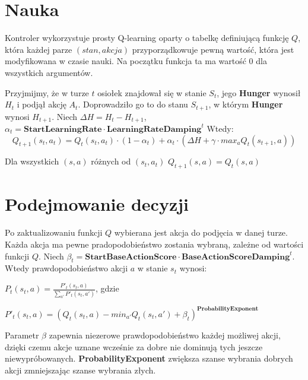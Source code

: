 \section{Nauka}
Kontroler wykorzystuje prosty Q-learning oparty o tabelkę definiującą funkcję $Q$, która każdej parze $(stan,akcja)$ przyporządkowuje pewną wartość, która jest modyfikowana w czasie nauki. Na początku funkcja ta ma wartość 0 dla wszystkich argumentów.

Przyjmijmy, że w turze $t$ osiołek znajdował się w stanie $S_{t}$, jego \textbf{Hunger} wynosił $H_{t}$ i podjął akcję $A_{t}$. Doprowadziło go to do stanu $S_{t+1}$, w którym \textbf{Hunger} wynosi $H_{t+1}$. Niech $\Delta H = H_{t} - H_{t+1}$, $\alpha_{t} = \textbf{StartLearningRate} \cdot \textbf{LearningRateDamping}^{t}$ Wtedy:
\[Q_{t+1}(s_{t},a_{t})= Q_{t}(s_{t},a_{t}) \cdot (1-\alpha_{t}) + \alpha_{t} \cdot (\Delta H + \gamma \cdot max_{a}Q_{t}(s_{t+1},a))
\]

Dla wszystkich $(s,a)$ różnych od $(s_{t},a_{t})$ $Q_{t+1}(s,a) = Q_{t}(s,a)$

\section{Podejmowanie decyzji}
Po zaktualizowaniu funkcji $Q$ wybierana jest akcja do podjęcia w danej turze. Każda akcja ma pewne pradopodobieństwo zostania wybraną, zależne od wartości funkcji $Q$. Niech $\beta_{t} = \textbf{StartBaseActionScore} \cdot \textbf{BaseActionScoreDamping}^{t}$. Wtedy prawdopodobieństwo akcji $a$ w stanie $s_{t}$ wynosi:

$P_{t}(s_{t},a) = \frac{P'_{t}(s_{t},a)}{\sum_{a'}P'_{t}(s_{t},a')}$, gdzie

$P'_{t}(s_{t},a) = (Q_{t}(s_{t},a) - min_{a'}Q_{t}(s_{t},a') + \beta_{t})^{\textbf{ProbabilityExponent}}$

Parametr $\beta$ zapewnia niezerowe prawdopodobieństwo każdej możliwej akcji, dzięki czemu akcje uznane wcześnie za dobre nie dominują tych jeszcze niewypróbowanych. \textbf{ProbabilityExponent} zwiększa szanse wybrania dobrych akcji zmniejszając szanse wybrania złych.